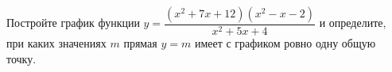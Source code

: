 \begin{ex}
	\begin{condition}
		Постройте график функции \( y=\dfrac{(x^2+7x+12)(x^2-x-2)}{x^2+5x+4} \) и определите, при каких значениях \( m \) прямая \( y=m \) имеет с графиком ровно одну общую точку.
	\end{condition}
\end{ex}